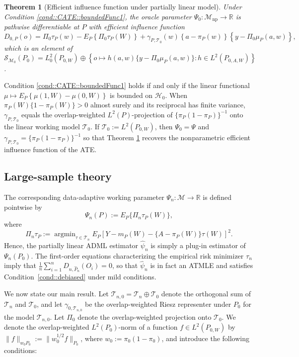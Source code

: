 \documentclass[11pt]{article}
\DeclareMathOperator*{\argmin}{argmin}
\newtheorem{theorem}{Theorem}
\theoremstyle{definition}
\begin{document}
  
\begin{theorem}[Efficient influence function under partially linear model]
    Under Condition \ref{cond::CATE::boundedFunc1}, the oracle parameter $\Psi_0:\mathcal{M}_{\mathrm{np}}\rightarrow\mathbb{R}$ is pathwise differentiable at $P$ with efficient influence function
    $$D_{0,P}(o) = \Pi_0 \tau_P(w) - E_P\left\{\Pi_0\tau_P(W)\right\} +  \gamma_{P, \mathcal{T}_0}(w)\left\{a - \pi_P(w)\right\}\left\{y - \Pi_0 \mu_P(a,w) \right\},$$ 
    which is an element of $\mathcal{S}_{\mathcal{M}_0}(P_0) = L^2_0(P_{0,W}) \oplus \left\{o \mapsto h(a,w)\{y - \Pi_0 \mu_P(a,w)\} : h \in L^2(P_{0,A,W})\right\}$.\label{example::theorem::RlearnerEIF}
\end{theorem}
Condition \ref{cond::CATE::boundedFunc1} holds if and only if the linear functional $\mu \mapsto E_P\left\{\mu(1,W) - \mu(0,W)\right\}$ is bounded on $\mathcal{H}_0$. When $\pi_P(W)\{1-\pi_P(W)\} > 0$ almost surely and its reciprocal has finite variance, $\gamma_{P, \mathcal{T}_0}$ equals the overlap-weighted $L^2(P)$-projection of $\{\pi_P(1-\pi_P)\}^{-1}$ onto the linear working model $\mathcal{T}_0$. If $\mathcal{T}_0 := L^2(P_{0,W})$, then $\Psi_0 = \Psi$ and $\gamma_{P, \mathcal{T}_0} = \{\pi_P(1-\pi_P)\}^{-1}$ so that Theorem \ref{example::theorem::RlearnerEIF} recovers the nonparametric efficient influence function of the ATE. 
 

 
\subsection{Large-sample theory}
\label{section::DataAdaptexampleATEPartially}

 



The corresponding data-adaptive working parameter \(\Psi_n:\mathcal{M}\to\mathbb{R}\) is defined pointwise by
\[
\Psi_n(P) := E_P\{\Pi_n\tau_P(W)\},
\]
where
\[
\Pi_n\tau_P := \argmin_{\tau \in \mathcal{T}_n} E_P \left[Y - m_P(W) - \{A - \pi_P(W)\}\tau(W)\right]^2.
\]
Hence, the partially linear ADML estimator \(\widehat{\psi}_n\) is simply a plug-in estimator of \(\Psi_n(P_0)\). The first-order equations characterizing the empirical risk minimizer \(\tau_n\) imply that \(\frac{1}{n}\sum_{i=1}^{n} D_{n,\widehat{P}_n}(O_i) = 0\), so that \(\widehat{\psi}_n\) is in fact an ATMLE and satisfies Condition~\ref{cond::debiased} under mild conditions.

We now state our main result. Let \(\mathcal{T}_{n,0} = \mathcal{T}_n \oplus \mathcal{T}_0\) denote the orthogonal sum of \(\mathcal{T}_n\) and \(\mathcal{T}_0\), and let \( \gamma_{0,\mathcal{T}_{n,0}}\) be the overlap-weighted Riesz representer under \(P_0\) for the model \(\mathcal{T}_{n,0}\). Let \(\Pi_{0}\) denote the overlap-weighted projection onto \(\mathcal{T}_0\). We denote the overlap-weighted \(L^2(P_0)\)-norm of a function \(f \in L^2(P_{0,W})\) by \(\|f\|_{w_0P_0} := \|w_0^{1/2}f\|_{P_0}\), where \(w_0 := \pi_0(1-\pi_0)\), and introduce the following conditions:
\end{document}
